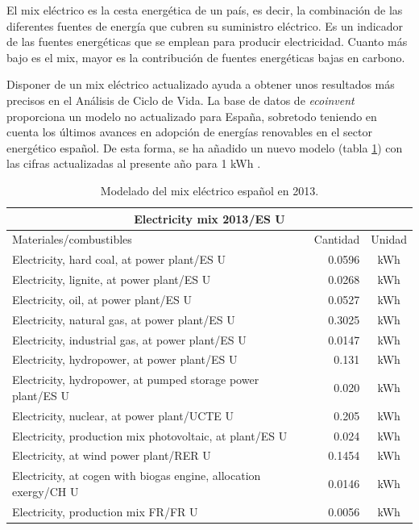 El mix eléctrico es la cesta energética de un país, es decir, la combinación de las diferentes fuentes de energía que cubren su suministro eléctrico. Es un indicador de las fuentes energéticas que se emplean para producir electricidad. Cuanto más bajo es el mix, mayor es la contribución de fuentes energéticas bajas en carbono.

Disponer de un mix eléctrico actualizado ayuda a obtener unos resultados más precisos en el Análisis de Ciclo de Vida. La base de datos de \textit{ecoinvent} proporciona un modelo no actualizado para España, sobretodo teniendo en cuenta los últimos avances en adopción de energías renovables en el sector energético español. De esta forma, se ha añadido un nuevo modelo (tabla \ref{modeladomixelectrico}) con las cifras actualizadas al presente año para 1 \si{kWh} \cite{mlgceballos}.

\begin{table}[!htb]
\centering
\begin{tabular}{p{8cm}rc}
\toprule
\multicolumn{3}{c}{Electricity mix 2013/ES U}\\
\midrule
Materiales/combustibles & Cantidad & Unidad\\
\midrule
Electricity, hard coal, at power plant/ES U & 0.0596 & \si{kWh}\\
Electricity, lignite, at power plant/ES U & 0.0268 & \si{kWh}\\
Electricity, oil, at power plant/ES U & 0.0527 & \si{kWh}\\
Electricity, natural gas, at power plant/ES U & 0.3025 & \si{kWh}\\
Electricity, industrial gas, at power plant/ES U & 0.0147 & \si{kWh}\\
Electricity, hydropower, at power plant/ES U & 0.131 & \si{kWh}\\
Electricity, hydropower, at pumped storage power plant/ES U & 0.020 & \si{kWh}\\
Electricity, nuclear, at power plant/UCTE U & 0.205 & \si{kWh}\\
Electricity, production mix photovoltaic, at plant/ES U & 0.024 & \si{kWh}\\
Electricity, at wind power plant/RER U & 0.1454 & \si{kWh}\\
Electricity, at cogen with biogas engine, allocation exergy/CH U & 0.0146 & \si{kWh}\\
Electricity, production mix FR/FR U & 0.0056 & \si{kWh}\\
\bottomrule
\end{tabular}
\caption{Modelado del mix eléctrico español en 2013.}
\label{modeladomixelectrico}
\end{table}

